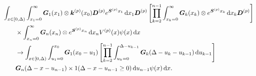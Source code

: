 \begin{align}
	&\int_{x\in[0,\Delta)} \int_{x_1=0}^\infty \bs G_1(x_1) \otimes \bs k^{(p)} (x_0) \bs D^{(p)} e^{\bs{S}^{(p)}x_1}\wrt x_1\bs D^{(p)} 
			\left[\prod_{k=2}^{n-1}\int_{x_k=0}^\infty \bs G_{k}(x_k) \otimes e^{\bs{S}^{(p)}x_k} \wrt x_k
	\bs D^{(p)} \right] \nonumber 
			\\&\qquad{}\times\int_{x_n=0}^\infty \bs G_{n}(x_n) \otimes e^{\bs{S}^{(p)}x_n} \wrt x_n V^{(p)}(x) \psi(x)\wrt x \nonumber 
%
	\\&\qquad {}\to \int_{x\in[0,\Delta)} \int_{u_1=0}^{x_0}\bs G_1(x_0 - u_1)
	\left[\prod_{k=2}^{n-1} \int_{u_k=0}^{\Delta-u_{k-1}} \bs {G}_{k}(\Delta-u_k-u_{k-1})\wrt u_{k-1}\right] \nonumber 
			\\&\qquad{} \bs G_{n}(\Delta - x-u_{n-1})
		 \times1(\Delta-x-u_{n-1}\geq0)\wrt u_{n-1}\psi(x)\wrt x.  \nonumber
\end{align}
